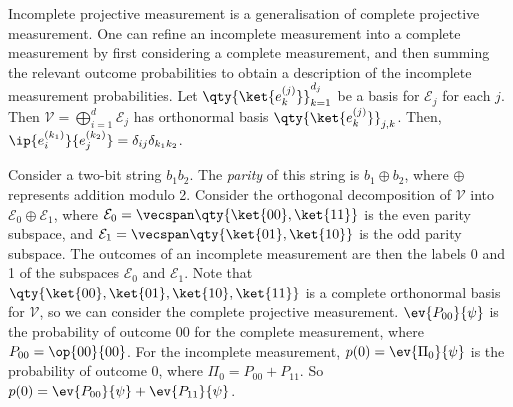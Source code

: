 Incomplete projective measurement is a generalisation of complete projective measurement.
One can refine an incomplete measurement into a complete measurement by first considering a complete measurement, and then summing the relevant outcome probabilities to obtain a description of the incomplete measurement probabilities.
Let \( \qty{\ket{e_k^{(j)}}}_{k=1}^{d_j} \) be a basis for \( \mathcal E_j \) for each \( j \).
Then \( \mathcal V = \bigoplus_{i=1}^d \mathcal E_j \) has orthonormal basis \( \qty{\ket{e_k^{(j)}}}_{j,k} \).
Then, \( \ip{e_i^{(k_1)}}{e_j^{(k_2)}} = \delta_{ij} \delta_{k_1 k_2} \).

Consider a two-bit string \( b_1 b_2 \).
The \emph{parity} of this string is \( b_1 \oplus b_2 \), where \( \oplus \) represents addition modulo 2.
Consider the orthogonal decomposition of \( \mathcal V \) into \( \mathcal E_0 \oplus \mathcal E_1 \), where \( \mathcal E_0 = \vecspan \qty{\ket{00}, \ket{11}} \) is the even parity subspace, and \( \mathcal E_1 = \vecspan \qty{\ket{01}, \ket{10}} \) is the odd parity subspace.
The outcomes of an incomplete measurement are then the labels 0 and 1 of the subspaces \( \mathcal E_0 \) and \( \mathcal E_1 \).
Note that \( \qty{\ket{00}, \ket{01}, \ket{10}, \ket{11}} \) is a complete orthonormal basis for \( \mathcal V \), so we can consider the complete projective measurement.
\( \ev{P_{00}}{\psi} \) is the probability of outcome \( 00 \) for the complete measurement, where \( P_{00} = \op{00}{00} \).
For the incomplete measurement, \( p(0) = \ev{\Pi_0}{\psi} \) is the probability of outcome 0, where \( \Pi_0 = P_{00} + P_{11} \).
So \( p(0) = \ev{P_{00}}{\psi} + \ev{P_{11}}{\psi} \).

